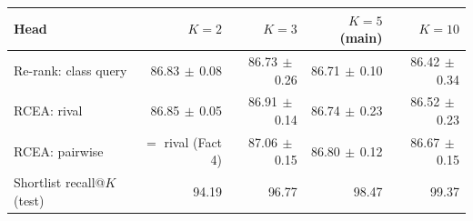 \begin{tabular}{lrrrr}
\toprule
Head & $K=2$ & $K=3$ & $K=5$ (main) & $K=10$ \\
\midrule
Re-rank: class query & 86.83{\scriptsize$\,\pm\,$0.08} & 86.73{\scriptsize$\,\pm\,$0.26} & 86.71{\scriptsize$\,\pm\,$0.10} & 86.42{\scriptsize$\,\pm\,$0.34} \\
RCEA: rival & 86.85{\scriptsize$\,\pm\,$0.05} & 86.91{\scriptsize$\,\pm\,$0.14} & 86.74{\scriptsize$\,\pm\,$0.23} & 86.52{\scriptsize$\,\pm\,$0.23} \\
RCEA: pairwise & $=$ rival (Fact 4) & 87.06{\scriptsize$\,\pm\,$0.15} & 86.80{\scriptsize$\,\pm\,$0.12} & 86.67{\scriptsize$\,\pm\,$0.15} \\
\midrule
Shortlist recall@$K$ (test) & 94.19 & 96.77 & 98.47 & 99.37 \\
\bottomrule
\end{tabular}

